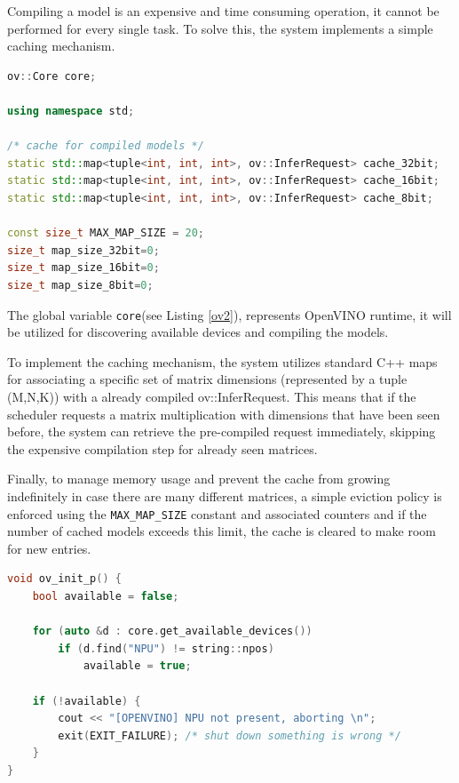 Compiling a model is an expensive and time consuming operation, it cannot be performed for every single task. To solve this, the system implements a simple caching mechanism.

\begin{lstlisting}[caption={ov runner.cpp chaching}, language=C++, label={ov2}] 
ov::Core core;

using namespace std;

/* cache for compiled models */
static std::map<tuple<int, int, int>, ov::InferRequest> cache_32bit;
static std::map<tuple<int, int, int>, ov::InferRequest> cache_16bit;
static std::map<tuple<int, int, int>, ov::InferRequest> cache_8bit;

const size_t MAX_MAP_SIZE = 20; 
size_t map_size_32bit=0;
size_t map_size_16bit=0;
size_t map_size_8bit=0;
\end{lstlisting}

The global variable \texttt{core}(see Listing \ref{ov2}), represents OpenVINO runtime, it will be utilized for discovering available devices and compiling the models.

To implement the caching mechanism, the system utilizes standard C++ maps for associating a specific set of matrix dimensions (represented by a tuple (M,N,K)) with a already compiled ov::InferRequest. This means that if the scheduler requests a matrix multiplication with dimensions that have been seen before, the system can retrieve the pre-compiled request immediately, skipping the expensive compilation step for already seen matrices. 

Finally, to manage memory usage and prevent the cache from growing indefinitely in case there are many different matrices, a simple eviction policy is enforced using the \texttt{MAX\_MAP\_SIZE} constant and associated counters and if the number of cached models exceeds this limit, the cache is cleared to make room for new entries.

\begin{lstlisting}[caption={ov runner.cpp init}, language=C++, label={ovinit}] 
void ov_init_p() {
    bool available = false;

    for (auto &d : core.get_available_devices())
        if (d.find("NPU") != string::npos)
            available = true;

    if (!available) {
        cout << "[OPENVINO] NPU not present, aborting \n";
        exit(EXIT_FAILURE); /* shut down something is wrong */
    }
}
\end{lstlisting}


